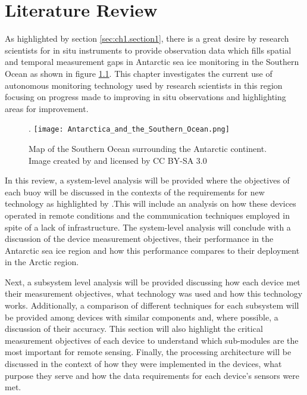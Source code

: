
\chapter{Literature Review}
\label{ch:chapter2}
As highlighted by section \ref{sec:ch1.section1}, there is a great desire by research scientists for in situ instruments to provide observation data which fills spatial and temporal measurement gaps in Antarctic sea ice monitoring in the Southern Ocean as shown in figure \ref{fig:Antarctica_Southern_Ocean}. This chapter investigates the current use of autonomous monitoring technology used by research scientists in this region focusing on progress made to improving in situ observations and highlighting areas for improvement. 
\begin{figure}[H]
	\centering. 
	\texttt{[image: Antarctica\_and\_the\_Southern\_Ocean.png]}
	\caption{Map of the Southern Ocean surrounding the Antarctic continent. Image created by \textcite{Hogweed2015Ocean} and licensed by CC BY-SA 3.0}
	\label{fig:Antarctica_Southern_Ocean}
\end{figure}

 In this review, a system-level  analysis will be provided where the objectives of each buoy will be discussed in the contexts of the requirements for new technology as highlighted by \textcite{kennicutt2016delivering}.This will include an analysis on how these devices operated in remote conditions and the communication techniques employed in spite of a lack of infrastructure. The system-level analysis will conclude with a discussion of the device measurement objectives, their performance in the Antarctic sea ice region and how this performance compares to their deployment in the Arctic region.\par
 
Next, a subsystem level analysis will be provided discussing how each device met their measurement objectives, what technology was used and how this technology works. Additionally, a comparison of different techniques for each subsystem will be provided among devices with similar components and, where possible, a discussion of their accuracy. This section will also highlight the critical measurement objectives of each device to understand which sub-modules are the most important for remote sensing. Finally, the processing architecture will be discussed in the context of how they were implemented in the devices, what purpose they serve and how the data requirements for each device's sensors were met.

